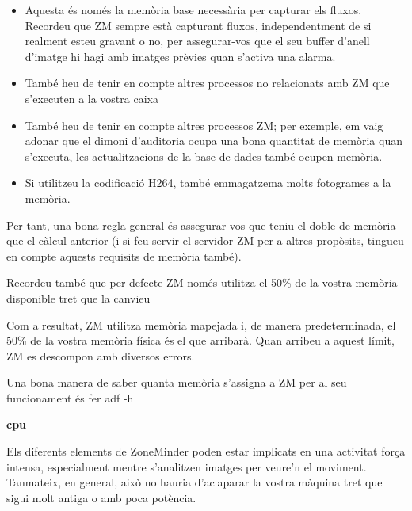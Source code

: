 \documentclass[
  10pt,
]{krantz}
\providecommand{\tightlist}{%
  \setlength{\itemsep}{0pt}\setlength{\parskip}{0pt}}
\begin{document}
\begin{itemize}
\tightlist
\item
  Aquesta és només la memòria base necessària per capturar els fluxos. Recordeu que ZM sempre està capturant fluxos, independentment de si realment esteu gravant o no, per assegurar-vos que el seu buffer d'anell d'imatge hi hagi amb imatges prèvies quan s'activa una alarma.
\item
  També heu de tenir en compte altres processos no relacionats amb ZM que s'executen a la vostra caixa
\item
  També heu de tenir en compte altres processos ZM; per exemple, em vaig adonar que el dimoni d'auditoria ocupa una bona quantitat de memòria quan s'executa, les actualitzacions de la base de dades també ocupen memòria.
\item
  Si utilitzeu la codificació H264, també emmagatzema molts fotogrames a la memòria.
\end{itemize}

Per tant, una bona regla general és assegurar-vos que teniu el doble de memòria que el càlcul anterior (i si feu servir el servidor ZM per a altres propòsits, tingueu en compte aquests requisits de memòria també).

Recordeu també que per defecte ZM només utilitza el 50\% de la vostra memòria disponible tret que la canvieu

Com a resultat, ZM utilitza memòria mapejada i, de manera predeterminada, el 50\% de la vostra memòria física és el que arribarà. Quan arribeu a aquest límit, ZM es descompon amb diversos errors.

Una bona manera de saber quanta memòria s'assigna a ZM per al seu funcionament és fer adf -h

\textbf{cpu}

Els diferents elements de ZoneMinder poden estar implicats en una activitat força intensa, especialment mentre s'analitzen imatges per veure'n el moviment. Tanmateix, en general, això no hauria d'aclaparar la vostra màquina tret que sigui molt antiga o amb poca potència.
\end{document}
